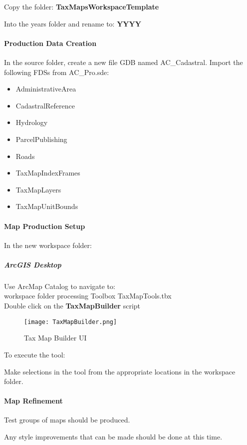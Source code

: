 \noindent Copy the folder: \textbf{TaxMapsWorkspaceTemplate}

\noindent Into the years folder and rename to: \textbf{YYYY}


\paragraph{Production Data Creation}In the source folder, create a new file GDB named AC\_Cadastral.  Import the following FDSs from AC\_Pro.sde:
\begin{itemize}
\item AdministrativeArea
\item CadastralReference
\item Hydrology
\item ParcelPublishing
\item Roads
\item TaxMapIndexFrames
\item TaxMapLayers
\item TaxMapUnitBounds
\end{itemize}
\clearpage
\paragraph{Map Production Setup} In the new workspace folder:

\subparagraph{ArcGIS Desktop}

Use ArcMap Catalog to navigate to:\\
workspace folder{\menuArrow} processing {\menuArrow} Toolbox {\menuArrow} TaxMapTools.tbx\\
Double click on the \textbf{TaxMapBuilder} script

\begin{figure}[h!]
 \centering
     \texttt{[image: TaxMapBuilder.png]}
 \caption{Tax Map Builder UI}
 \end{figure}

\noindent To execute the tool:

\noindent Make selections in the tool from the appropriate locations in the workspace folder.
\clearpage
\paragraph{Map Refinement}Test groups of maps should be produced.  

\noindent Any style improvements that can be made should be done at this time.

